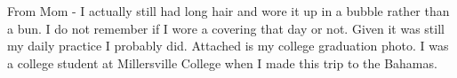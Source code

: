 From Mom - I actually still had long hair and wore it up in a bubble rather than a bun.
I do not remember if I wore a covering that day or not.
Given it was still my daily practice I probably did.
Attached is my college graduation photo.
I was a college student at Millersville College when I made this trip to the Bahamas.






